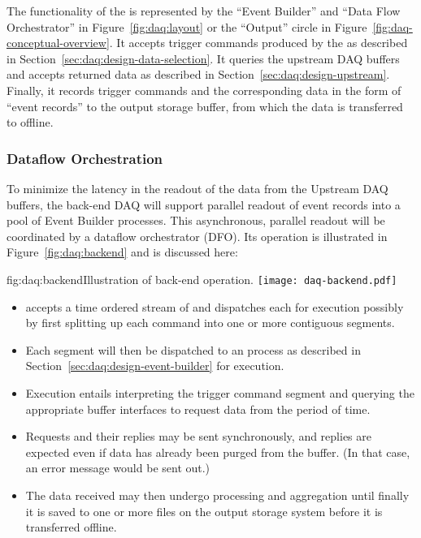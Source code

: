 The functionality of the  is represented by the ``Event Builder''
and ``Data Flow Orchestrator'' in Figure~\ref{fig:daq:layout} or the ``Output''
circle in Figure~\ref{fig:daq-conceptual-overview}. 
It accepts trigger commands produced by the  as described in
Section~\ref{sec:daq:design-data-selection}. 
It queries the upstream DAQ buffers and accepts returned data as described in
Section~\ref{sec:daq:design-upstream}. 
Finally, it records trigger commands and the corresponding data in the form of
``event records'' to the output storage buffer, from which the data is
transferred to offline.

\subsubsection{Dataflow Orchestration}

To minimize the latency in the readout of the data from the Upstream DAQ
buffers, the back-end DAQ will support parallel readout of event records into a
pool of Event Builder processes. 
This asynchronous, parallel readout will be coordinated by a dataflow
orchestrator (DFO). 
Its operation is illustrated in Figure~\ref{fig:daq:backend} and is discussed
here:

\begin{dunefigure}{fig:daq:backend}{Illustration of   back-end operation.}
  \texttt{[image: daq-backend.pdf]}
\end{dunefigure}

\begin{itemize}
\item {} accepts a time ordered stream of  and
  dispatches each for execution possibly by first splitting up each command into
  one or more contiguous segments.
\item Each segment will then be dispatched to an  process as described
  in Section~\ref{sec:daq:design-event-builder} for execution.
\item Execution entails interpreting the trigger command segment and querying
  the appropriate  buffer interfaces to request data from the period
  of time. 
\item Requests and their replies may be sent synchronously, and replies are
  expected even if data has already been purged from the  buffer.
  (In that case, an error message would be sent out.)
\item The data received may then undergo processing and aggregation
  until finally it is saved to one or more files on the output storage
  system before it is transferred offline.
\end{itemize}


